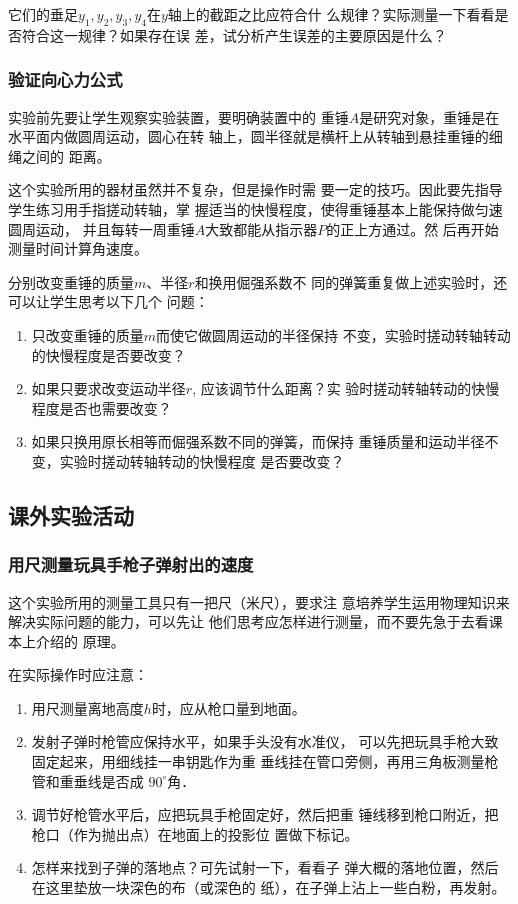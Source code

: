 它们的垂足$y_1,y_2,y_3,y_4$在$y$轴上的截距之比应符合什
么规律？实际测量一下看看是否符合这一规律？如果存在误
差，试分析产生误差的主要原因是什么？

\subsubsection{验证向心力公式}
实验前先要让学生观察实验装置，要明确装置中的
重锤$A$是研究对象，重锤是在水平面内做圆周运动，圆心在转
轴上，圆半径就是横杆上从转轴到悬挂重锤的细绳之间的
距离。

这个实验所用的器材虽然并不复杂，但是操作时需
要一定的技巧。因此要先指导学生练习用手指搓动转轴，掌
握适当的快慢程度，使得重锤基本上能保持做匀速圆周运动，
并且每转一周重锤$A$大致都能从指示器$P$的正上方通过。然
后再开始测量时间计算角速度。

分别改变重锤的质量$m$、半径$r$和换用倔强系数不
同的弹簧重复做上述实验时，还可以让学生思考以下几个
问题：
\begin{enumerate}
\item 只改变重锤的质量$m$而使它做圆周运动的半径保持
不变，实验时搓动转轴转动的快慢程度是否要改变？
\item 如果只要求改变运动半径$r$, 应该调节什么距离？实
验时搓动转轴转动的快慢程度是否也需要改变？
\item 如果只换用原长相等而倔强系数不同的弹簧，而保持
重锤质量和运动半径不变，实验时搓动转轴转动的快慢程度
是否要改变？
\end{enumerate}

\subsection{课外实验活动}

\subsubsection{用尺测量玩具手枪子弹射出的速度}

这个实验所用的测量工具只有一把尺（米尺），要求注
意培养学生运用物理知识来解决实际问题的能力，可以先让
他们思考应怎样进行测量，而不要先急于去看课本上介绍的
原理。

在实际操作时应注意：
\begin{enumerate}
\item 用尺测量离地高度$h$时，应从枪口量到地面。
\item 发射子弹时枪管应保持水平，如果手头没有水准仪，
可以先把玩具手枪大致固定起来，用细线挂一串钥匙作为重
垂线挂在管口旁侧，再用三角板测量枪管和重垂线是否成
$90^{\circ}$角．
\item 调节好枪管水平后，应把玩具手枪固定好，然后把重
锤线移到枪口附近，把枪口（作为抛出点）在地面上的投影位
置做下标记。
\item 怎样来找到子弹的落地点？可先试射一下，看看子
弹大概的落地位置，然后在这里垫放一块深色的布（或深色的
纸），在子弹上沾上一些白粉，再发射。
\end{enumerate}

